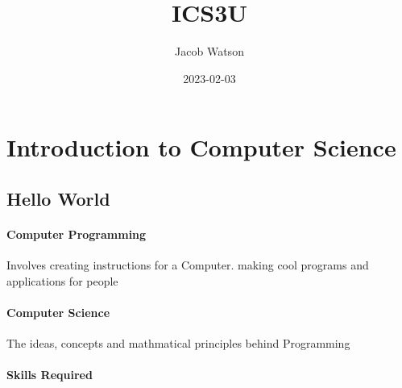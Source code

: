\documentclass{article}
\title{ICS3U}
\date{2023-02-03}
\author{Jacob Watson}
\begin{document}
    \maketitle{}

    \tableofcontents{}

    \section{Introduction to Computer Science}
        \subsection{Hello World}
            \paragraph{Computer Programming}
                Involves creating instructions for a Computer. making cool programs and applications for people
            \paragraph{Computer Science}
                The ideas, concepts and mathmatical principles behind Programming
            \paragraph{Skills Required}
            
\end{document}
